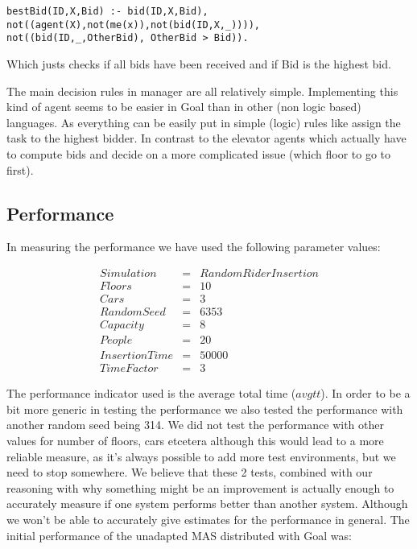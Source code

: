 \documentclass[a4paper,11pt]{article}
\begin{document}
\begin{verbatim}
bestBid(ID,X,Bid) :- bid(ID,X,Bid), not((agent(X),not(me(x)),not(bid(ID,X,_)))), 
not((bid(ID,_,OtherBid), OtherBid > Bid)).
\end{verbatim}
Which justs checks if all bids have been received and if Bid is the highest bid.

The main decision rules in manager are all relatively simple. Implementing this kind of agent seems to be easier in Goal than in other (non logic based) languages. As everything can be easily put in simple (logic) rules like assign the task to the highest bidder. In contrast to the elevator agents which actually have to compute bids and decide on a more complicated issue (which floor to go to first). 

\subsection{Performance}
In measuring the performance we have used the following parameter values:

\[\begin{array}{lcl}
Simulation & = & Random Rider Insertion\\
Floors & = & 10\\
Cars & = & 3\\
RandomSeed & = & 6353\\
Capacity & = & 8\\
People & = & 20\\
InsertionTime & = & 50000\\
TimeFactor & = & 3
\end{array}\] 

\pagebreak

The performance indicator used is the average total time ($avgtt$). In order to be a bit more generic in testing the performance we also tested the performance with another random seed being 314. We did not test the performance with other values for number of floors, cars etcetera although this would lead to a more reliable measure, as it's always possible to add more test environments, but we need to stop somewhere. We believe that these 2 tests, combined with our reasoning with why something might be an improvement is actually enough to accurately measure if one system performs better than another system. Although we won't be able to accurately give estimates for the performance in general.
\newline\newline
The initial performance of the unadapted MAS distributed with Goal was:
\end{document}
